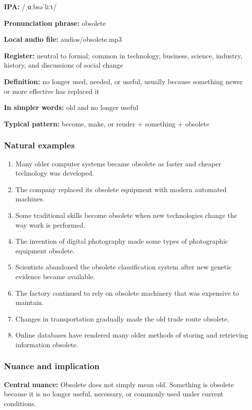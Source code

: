 \documentclass[11pt]{article}
\begin{document}
\textbf{IPA:} /ˌɑːbsəˈliːt/

\textbf{Pronunciation phrase:} obsolete

\textbf{Local audio file:} audios/obsolete.mp3

\textbf{Register:} neutral to formal; common in technology, business, science, industry, history, and discussions of social change

\textbf{Definition:} no longer used, needed, or useful, usually because something newer or more effective has replaced it

\textbf{In simpler words:} old and no longer useful

\textbf{Typical pattern:} become, make, or render + something + obsolete

\subsubsection{Natural examples}
\begin{enumerate}
  \item Many older computer systems became obsolete as faster and cheaper technology was developed.
  \item The company replaced its obsolete equipment with modern automated machines.
  \item Some traditional skills become obsolete when new technologies change the way work is performed.
  \item The invention of digital photography made some types of photographic equipment obsolete.
  \item Scientists abandoned the obsolete classification system after new genetic evidence became available.
  \item The factory continued to rely on obsolete machinery that was expensive to maintain.
  \item Changes in transportation gradually made the old trade route obsolete.
  \item Online databases have rendered many older methods of storing and retrieving information obsolete.
\end{enumerate}

\subsubsection{Nuance and implication}
\textbf{Central nuance:} Obsolete does not simply mean old. Something is obsolete because it is no longer useful, necessary, or commonly used under current conditions.
\end{document}
